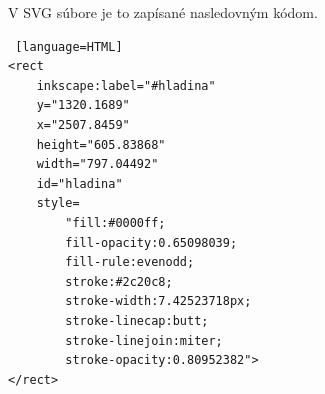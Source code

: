 V SVG súbore je to zapísané nasledovným kódom. 


\begin{lstlisting} [language=HTML]
<rect
	inkscape:label="#hladina"
	y="1320.1689"
	x="2507.8459"
	height="605.83868"
	width="797.04492"
	id="hladina"
	style=
		"fill:#0000ff;
		fill-opacity:0.65098039;
		fill-rule:evenodd;
		stroke:#2c20c8;
		stroke-width:7.42523718px;
		stroke-linecap:butt;
		stroke-linejoin:miter;
		stroke-opacity:0.80952382">
</rect>

\end{lstlisting}


%
%
%
%
